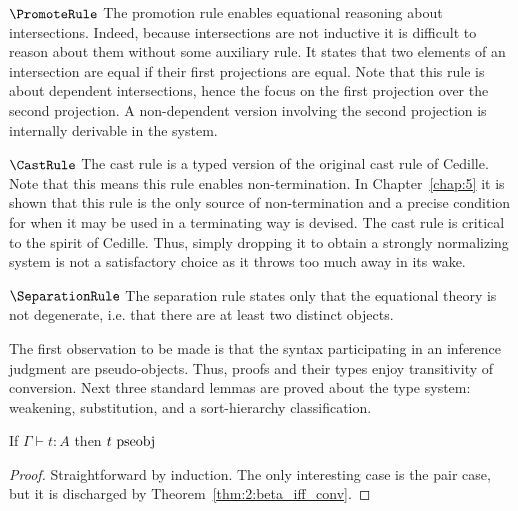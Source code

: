 $\PromoteRule$ The promotion rule enables equational reasoning about intersections.
Indeed, because intersections are not inductive it is difficult to reason about them without some auxiliary rule.
It states that two elements of an intersection are equal if their first projections are equal.
Note that this rule is about dependent intersections, hence the focus on the first projection over the second projection.
A non-dependent version involving the second projection is internally derivable in the system.

$\CastRule$ The cast rule is a typed version of the original cast rule of Cedille.
Note that this means this rule enables non-termination.
In Chapter~\ref{chap:5} it is shown that this rule is the only source of non-termination and a precise condition for when it may be used in a terminating way is devised.
The cast rule is critical to the spirit of Cedille.
Thus, simply dropping it to obtain a strongly normalizing system is not a satisfactory choice as it throws too much away in its wake.

$\SeparationRule$ The separation rule states only that the equational theory is not degenerate, i.e. that there are at least two distinct objects.



The first observation to be made is that the syntax participating in an inference judgment are pseudo-objects.
Thus, proofs and their types enjoy transitivity of conversion.
Next three standard lemmas are proved about the type system: weakening, substitution, and a sort-hierarchy classification.

\begin{lemma}
    If $\Gamma \vdash t : A$ then $t~\textnormal{pseobj}$
    \label{lem:2:infer_implies_pseobj}
\end{lemma}
\begin{proof}
    Straightforward by induction.
    The only interesting case is the pair case, but it is discharged by Theorem~\ref{thm:2:beta_iff_conv}.
\end{proof}

